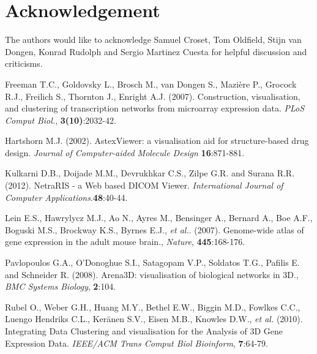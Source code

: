 \documentclass{bioinfo}
\begin{document}
\section*{Acknowledgement}
The authors would like to acknowledge Samuel Croset, Tom Oldfield, Stijn van Dongen, Konrad Rudolph and Sergio Martinez Cuesta for helpful discussion and criticisms.

%
%
%
%
%

%

%

\begin{thebibliography}{}

 Freeman T.C., Goldovsky L., Brosch M., van Dongen S., Mazière P., Grocock R.J., Freilich S., Thornton J., Enright A.J. (2007). Construction, visualisation, and clustering of transcription networks from microarray expression data. {\it{PLoS Comput Biol.}}, {\bf{3(10)}}:2032-42.

 Hartshorn M.J. (2002). AstexViewer: a visualisation aid for structure-based drug design. {\it{Journal of Computer-aided Molecule Design}} {\bf{16}}:871-881.

 Kulkarni D.B., Doijade M.M., Devrukhkar C.S., Zilpe G.R. and Surana R.R. (2012). NetraRIS - a Web based DICOM Viewer. {\it{International Journal of Computer Applications}}.{\bf{48}}:40-44.

 Lein E.S., Hawrylycz M.J., Ao N., Ayres M., Bensinger A., Bernard A., Boe A.F., Boguski M.S., Brockway K.S., Byrnes E.J., {\it{et al.}}. (2007). Genome-wide atlas of gene expression in the adult mouse brain., {\it Nature}, {\bf{445}}:168-176.

 Pavlopoulos G.A., O'Donoghue S.I., Satagopam V.P., Soldatos T.G., Pafilis E. and Schneider R. (2008). Arena3D: visualisation of biological networks in 3D., {\it BMC Systems Biology}, {\bf{2}}:104.

 Rubel O., Weber G.H., Huang M.Y., Bethel E.W., Biggin M.D., Fowlkes C.C., Luengo Hendriks C.L., Ker\"{a}nen S.V., Eisen M.B., Knowles D.W., {\it{et al.}} (2010). Integrating Data Clustering and visualisation for the Analysis of 3D Gene Expression Data. {\it IEEE/ACM Trans Comput Biol Bioinform}, {\bf{7}}:64-79.


\end{thebibliography}
\end{document}
